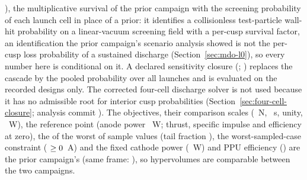 \MdbClosureStatus), the multiplicative survival of the prior campaign with the
screening probability of each launch cell in place of a prior: it identifies a
collisionless test-particle wall-hit probability on a linear-vacuum screening field
with a per-cusp survival factor, an identification the prior campaign's scenario
analysis showed is not the per-cusp loss probability of a sustained discharge
(Section~\ref{sec:mdo-l0}), so every number here is conditional on it. A declared
sensitivity closure \texttt{\MdbSensitivityClosureId} (\MdbSensitivityClosureShort;
\MdbSensitivityClosureStatus) replaces the cascade by the pooled probability over all
\MdbPooledTrials{} launches and is evaluated on the recorded designs only. The
corrected four-cell discharge solver is not used because it has no admissible root for
interior cusp probabilities (Section~\ref{sec:four-cell-closure}; analysis commit
\texttt{\MdbFourCellClosureCommit}). The \MdbObjectiveCount{} objectives, their
comparison scales (\MdbScaleThrust{}~N, \MdbScaleIsp{}~s, unity, \MdbScalePower{}~W),
the reference point (anode power \MdbRefAnodePowerW{}~W; thrust, specific impulse and
efficiency at zero), the \MdbRiskMeasure{} of the worst \MdbTailCount{} of
\MdbSampleCount{} sample values (tail fraction \MdbTailFraction), the worst-sampled-case
constraint (\texttt{\MdbConstraintName} $\ge 0$~A) and the fixed
cathode power (\MdbCathodePowerW{}~W) and PPU efficiency (\MdbPpuEfficiency) are the
prior campaign's (same frame: \MdbSameReferenceFrame), so hypervolumes are comparable
between the two campaigns.

